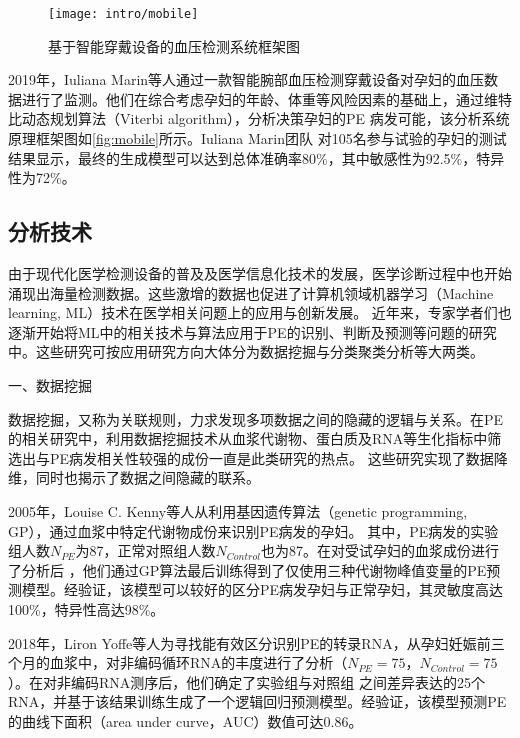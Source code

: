 \begin{figure}[htbp]
    \centering
    \texttt{[image: intro/mobile]}
    \caption[基于智能穿戴设备的血压检测系统框架图]{\label{fig:mobile}基于智能穿戴设备的血压检测系统框架图\cite{Marin2019,Marin2020}}
\end{figure}

2019年，Iuliana Marin等人\cite{Marin2019,Marin2020}通过一款智能腕部血压检测穿戴设备对孕妇的血压数据进行了监测。他们在综合考虑孕妇的年龄、体重等风险因素的基础上，通过维特比动态规划算法（Viterbi algorithm），分析决策孕妇的PE
病发可能，该分析系统原理框架图如\autoref{fig:mobile}所示。Iuliana Marin团队
对105名参与试验的孕妇的测试结果显示，最终的生成模型可以达到总体准确率80\%，其中敏感性为92.5\%，特异性为72\%\cite{Marin2019}。

\subsection{分析技术}
由于现代化医学检测设备的普及及医学信息化技术的发展，医学诊断过程中也开始涌现出海量检测数据。这些激增的数据也促进了计算机领域机器学习（Machine learning, ML）技术在医学相关问题上的应用与创新发展。
近年来，专家学者们也逐渐开始将ML中的相关技术与算法应用于PE的识别、判断及预测等问题的研究中。这些研究可按应用研究方向大体分为数据挖掘与分类聚类分析等大两类\cite{Mehta2016}。

一、数据挖掘

数据挖掘，又称为关联规则，力求发现多项数据之间的隐藏的逻辑与关系\cite{Han2006}。在PE的相关研究中，利用数据挖掘技术从血浆代谢物、蛋白质及RNA等生化指标中筛选出与PE病发相关性较强的成份一直是此类研究的热点。
这些研究实现了数据降维，同时也揭示了数据之间隐藏的联系。

2005年，Louise C. Kenny等人\cite{Kenny2005}从利用基因遗传算法（genetic programming, GP），通过血浆中特定代谢物成份来识别PE病发的孕妇。
其中，PE病发的实验组人数$N_{PE}$为87，正常对照组人数$N_{Control}$也为87。在对受试孕妇的血浆成份进行了分析后
，他们通过GP算法最后训练得到了仅使用三种代谢物峰值变量的PE预测模型。经验证，该模型可以较好的区分PE病发孕妇与正常孕妇，其灵敏度高达100\%，特异性高达98\%。

2018年，Liron Yoffe等人\cite{Yoffe2018}为寻找能有效区分识别PE的转录RNA，从孕妇妊娠前三个月的血浆中，对非编码循环RNA的丰度进行了分析（$N_{PE}=75$，$N_{Control}=75$）。在对非编码RNA测序后，他们确定了实验组与对照组
之间差异表达的25个RNA，并基于该结果训练生成了一个逻辑回归预测模型。经验证，该模型预测PE的曲线下面积（area under curve，AUC）数值可达0.86。


